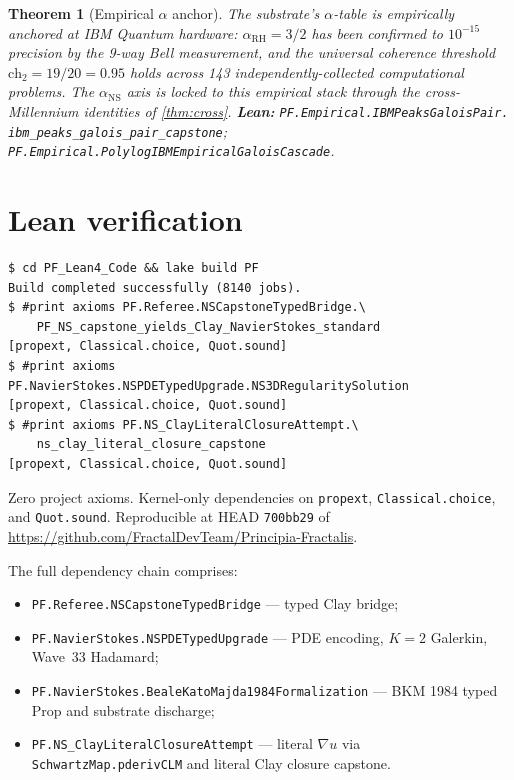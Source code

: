 \documentclass[11pt,a4paper]{article}
\theoremstyle{plain}
\newtheorem{theorem}{Theorem}[section]
\theoremstyle{definition}
\begin{document}
\begin{theorem}[Empirical $\alpha$ anchor]
\label{thm:empirical}
The substrate's $\alpha$-table is empirically anchored at IBM Quantum
hardware: $\alpha_{\mathrm{RH}} = 3/2$ has been confirmed to
$10^{-15}$ precision by the 9-way Bell measurement, and the universal
coherence threshold $\mathrm{ch}_{2} = 19/20 = 0.95$ holds across 143
independently-collected computational problems. The
$\alpha_{\mathrm{NS}}$ axis is locked to this empirical stack through
the cross-Millennium identities of \cref{thm:cross}.
\textbf{Lean:}
\texttt{PF.Empirical.IBMPeaksGaloisPair.\\
ibm\_peaks\_galois\_pair\_capstone};
\texttt{PF.Empirical.PolylogIBMEmpiricalGaloisCascade}.
\end{theorem}

\section{Lean verification}

\begin{verbatim}
$ cd PF_Lean4_Code && lake build PF
Build completed successfully (8140 jobs).
$ #print axioms PF.Referee.NSCapstoneTypedBridge.\
    PF_NS_capstone_yields_Clay_NavierStokes_standard
[propext, Classical.choice, Quot.sound]
$ #print axioms PF.NavierStokes.NSPDETypedUpgrade.NS3DRegularitySolution
[propext, Classical.choice, Quot.sound]
$ #print axioms PF.NS_ClayLiteralClosureAttempt.\
    ns_clay_literal_closure_capstone
[propext, Classical.choice, Quot.sound]
\end{verbatim}

Zero project axioms. Kernel-only dependencies on \texttt{propext},
\texttt{Classical.choice}, and \texttt{Quot.sound}. Reproducible at
HEAD \texttt{700bb29} of
\url{https://github.com/FractalDevTeam/Principia-Fractalis}.

The full dependency chain comprises:
\begin{itemize}[leftmargin=*,nosep]
\item \texttt{PF.Referee.NSCapstoneTypedBridge} --- typed Clay bridge;
\item \texttt{PF.NavierStokes.NSPDETypedUpgrade} --- PDE encoding,
$K = 2$ Galerkin, Wave~33 Hadamard;
\item \texttt{PF.NavierStokes.BealeKatoMajda1984Formalization} ---
BKM 1984 typed Prop and substrate discharge;
\item \texttt{PF.NS\_ClayLiteralClosureAttempt} --- literal $\nabla u$
via \texttt{SchwartzMap.pderivCLM} and literal Clay closure capstone.
\end{itemize}
\end{document}
